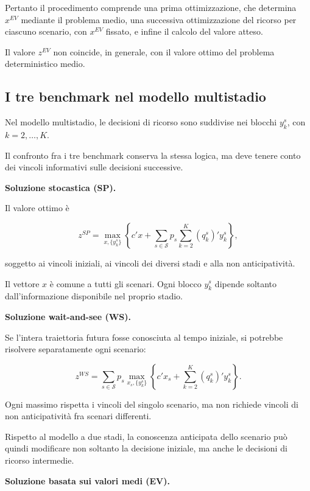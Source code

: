 Pertanto il procedimento comprende
una prima ottimizzazione, che determina
$x^{EV}$ mediante il problema medio,
una successiva ottimizzazione del ricorso
per ciascuno scenario, con $x^{EV}$ fissato,
e infine il calcolo del valore atteso.

Il valore $z^{EV}$ non coincide,
in generale, con il valore ottimo
del problema deterministico medio.

\subsection{I tre benchmark nel modello multistadio}

Nel modello multistadio, le decisioni di ricorso
sono suddivise nei blocchi $y_k^s$,
con $k=2,\ldots,K$.

Il confronto fra i tre benchmark conserva
la stessa logica, ma deve tenere conto
dei vincoli informativi sulle decisioni successive.

\medskip

\noindent
\textbf{Soluzione stocastica (SP).}

Il valore ottimo \`e

\[
z^{SP}
=
\max_{x,\{y_k^s\}}
\left\{
c'x+
\sum_{s\in\mathcal S}p_s
\sum_{k=2}^{K}(q_k^s)'y_k^s
\right\},
\]

soggetto ai vincoli iniziali,
ai vincoli dei diversi stadi
e alla non anticipativit\`a.

Il vettore $x$ \`e comune a tutti
gli scenari. Ogni blocco $y_k^s$
dipende soltanto dall'informazione
disponibile nel proprio stadio.

\medskip

\noindent
\textbf{Soluzione wait-and-see (WS).}

Se l'intera traiettoria futura fosse
conosciuta al tempo iniziale, si potrebbe
risolvere separatamente ogni scenario:

\[
z^{WS}
=
\sum_{s\in\mathcal S}p_s
\max_{x_s,\{y_k^s\}}
\left\{
c'x_s+
\sum_{k=2}^{K}(q_k^s)'y_k^s
\right\}.
\]

Ogni massimo rispetta i vincoli
del singolo scenario, ma non richiede
vincoli di non anticipativit\`a
fra scenari differenti.

Rispetto al modello a due stadi,
la conoscenza anticipata dello scenario
pu\`o quindi modificare non soltanto
la decisione iniziale, ma anche
le decisioni di ricorso intermedie.

\medskip

\noindent
\textbf{Soluzione basata sui valori medi (EV).}

